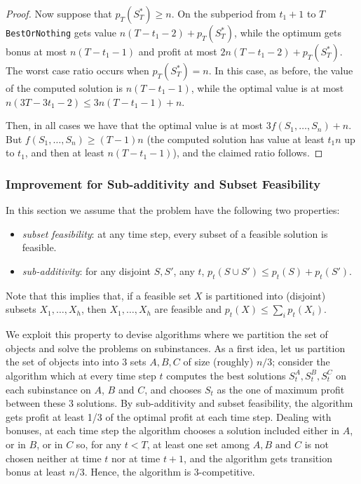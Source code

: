 \documentclass[a4paper]{book}
\newtheorem{proof}{\noindent{\bf Proof.} }
\newcommand{\finalversion}[1]{#1}
\begin{document}
\begin{proof}
Now suppose that $p_T(S^*_T)\geq n$. On the subperiod from $t_1+1$ to $T$ \texttt{BestOrNothing} gets value $n(T-t_1-2)+p_T(S^*_T)$, while the optimum gets bonus at most $n(T-t_1-1)$ and profit at most $2n(T-t_1-2)+p_T(S^*_T)$. The worst case ratio occurs when $p_T(S^*_T)= n$. In this case, as before, the value of the computed solution is $n(T-t_1-1)$, while the optimal value is at most $n\left( 3T-3t_1-2\right)\leq 3n(T-t_1-1)+n$.

Then, in all cases we have that the optimal value is at most $3f(S_1,\dots,S_n)+n$. But $f(S_1,\dots,S_n)\geq (T-1)n$ (the computed solution has value at least $t_1n$ up to $t_1$, and then at least $n(T-t_1-1)$), and the claimed ratio follows. %
\end{proof}

\subsubsection{Improvement for \finalversion{Sub-additivity} and Subset Feasibility}\label{subsec:submodular}

In this section we assume that the problem have the following two properties:
\begin{itemize}
    \item {\it subset feasibility}: at any time step, every subset of a feasible solution is feasible.
    \item \finalversion{{\it sub-additivity}: for any disjoint $S,S'$, any $t$, $p_t(S\cup S')\leq p_t(S)+p_t(S')$.}
\end{itemize}
Note that this implies that, if a feasible set $X$ is partitioned into (disjoint) subsets $X_1,\dots,X_h$, then $X_1,\dots,X_h$ are feasible and $p_t(X)\leq \sum_i p_t(X_i)$.

We exploit this property to devise algorithms where we partition the set of objects and solve the problems on subinstances. As a first idea, let us partition the set of objects into into $3$ sets $A,B,C$ of size (roughly) $n/3$;  consider the algorithm which at every time step $t$ computes the best solutions $S^A_t,S^B_t,S^C_t$ on each subinstance on $A$, $B$ and $C$, and chooses $S_t$ as the one of maximum profit between these 3 solutions. By \finalversion{sub-additivity} and subset feasibility, the algorithm gets profit at least 1/3 of the optimal profit at each time step. Dealing with bonuses, at each time step the algorithm chooses a solution included either in $A$, or in $B$, or in $C$ so, for any $t<T$, at least one set among $A, B \text{ and } C$ is not chosen neither at time $t$ nor at time $t+1$, and the algorithm gets transition bonus at least $n/3$. Hence, the algorithm is 3-competitive.
\end{document}

